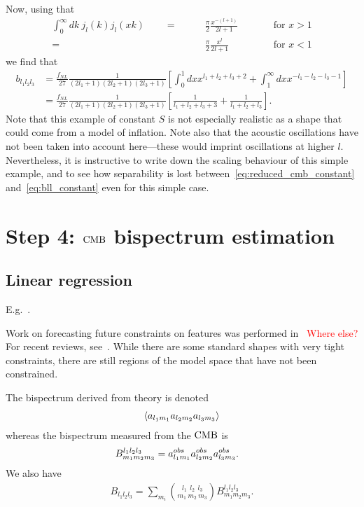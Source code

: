     Now, using that
    \begin{align}
        \int_0^\infty dk~j_l(k)j_l(xk)\qquad=\qquad&\frac{\pi}{2}\frac{x^{-(l+1)}}{2l+1}\qquad&&\text{for $x>1$}\\
                            =\qquad&\frac{\pi}{2}\frac{x^{l}}{2l+1}\qquad&&\text{for $x<1$}
    \end{align}
    we find that
    \begin{align} 
        b_{l_1l_2l_3} &= \frac{f_{NL}}{27}\frac{1}{(2l_1+1)(2l_2+1)(2l_3+1)}
        \left[\int^1_0dx x^{l_1+l_2+l_3+2}+\int^\infty_1dx x^{-l_1-l_2-l_3-1}\right]\label{eq:bll_constant_integral}\\
                &= \frac{f_{NL}}{27}\frac{1}{(2l_1+1)(2l_2+1)(2l_3+1)}
        \left[\frac{1}{l_1+l_2+l_3+3}+\frac{1}{l_1+l_2+l_3}\right]\label{eq:bll_constant}.
    \end{align}
    Note that this example of constant $S$ is not especially realistic as a shape that could
    come from a model of inflation. Note also that the acoustic oscillations have not been taken
    into account here---these would imprint oscillations at higher $l$.
    Nevertheless, it is instructive to write down the scaling behaviour of this
    simple example, and to see how separability is lost between~\eqref{eq:reduced_cmb_constant}
    and~\eqref{eq:bll_constant} even for this simple case.


    \section{Step 4: $\text{CMB}$ bispectrum estimation}
    \subsection{Linear regression}
    E.g.~\cite{Smith_2011, Komatsu_2005, Byun_1, Byun_2, modal_battefeld}.


Work on forecasting future constraints on features was performed
    in~\cite{Sohn_2019} \textcolor{red}{Where else?}
    For recent reviews, see~\cite{astro2020_png, astro2020_features, Ballardini_2017, Sypsas_2017,
    Palma_2017}.
    While there are some standard shapes with very tight constraints,
    there are still regions of the model space that have not been constrained.


    The bispectrum derived from theory is denoted
    \begin{align}
        \left<a_{l_1m_1}a_{l_2m_2}a_{l_3m_3}\right>
    \end{align}
    whereas the bispectrum measured from the $\text{CMB}$ is
    \begin{align}
        B^{l_1l_2l_3}_{m_1m_2m_3} &= a^{obs}_{l_1m_1}a^{obs}_{l_2m_2}a^{obs}_{l_3m_3}.
    \end{align}
    We also have
    \begin{align}\label{eq:bll}
        B_{l_1l_2l_3} = \sum_{m_i} {{l_1~~l_2~~l_3} \choose {m_1~m_2~m_3}} B^{l_1l_2l_3}_{m_1m_2m_3}.
    \end{align}


